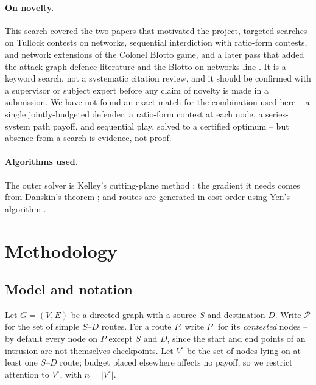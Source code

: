 \documentclass[11pt,a4paper]{article}
\theoremstyle{plain}
\theoremstyle{definition}
\newcommand{\Path}{\mathcal{P}}
\begin{document}
\paragraph{On novelty.}
This search covered the two papers that motivated the project, targeted
searches on Tullock contests on networks, sequential interdiction with
ratio-form contests, and network extensions of the Colonel Blotto game,
and a later pass that added the attack-graph defence literature
\citep{oruganti2023} and the Blotto-on-networks line
\citep{kovenock2018}. It is a keyword search, not a systematic citation
review, and it should be confirmed with a supervisor or subject expert
before any claim of novelty is made in a submission. We have not found an
exact match for the combination used here -- a single jointly-budgeted
defender, a ratio-form contest at each node, a series-system path payoff,
and sequential play, solved to a certified optimum -- but absence from a
search is evidence, not proof.

\paragraph{Algorithms used.}
The outer solver is Kelley's cutting-plane method \citep{kelley1960}; the
gradient it needs comes from Danskin's theorem \citep{danskin1967}; and
routes are generated in cost order using Yen's algorithm \citep{yen1971}.

\section{Methodology}
\label{sec:methods}

\subsection{Model and notation}
\label{sec:methods-model}

Let $G=(V,E)$ be a directed graph with a source $S$ and destination $D$.
Write $\Path$ for the set of simple $S$--$D$ routes. For a route $P$,
write $P^{\circ}$ for its \emph{contested} nodes -- by default every node
on $P$ except $S$ and $D$, since the start and end points of an intrusion
are not themselves checkpoints. Let $V^{\circ}$ be the set of nodes lying
on at least one $S$--$D$ route; budget placed elsewhere affects no payoff,
so we restrict attention to $V^{\circ}$, with $n=|V^{\circ}|$.
\end{document}
